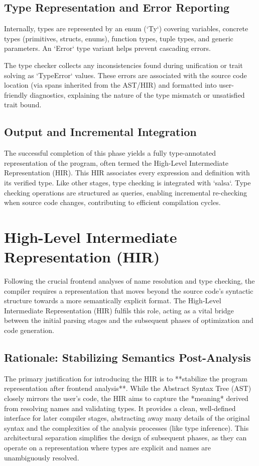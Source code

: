 \subsection{Type Representation and Error Reporting} %
Internally, types are represented by an enum (`Ty`) covering variables, concrete types (primitives, structs, enums), function types, tuple types, and generic parameters. An `Error` type variant helps prevent cascading errors.

The type checker collects any inconsistencies found during unification or trait solving as `TypeError` values. These errors are associated with the source code location (via spans inherited from the AST/HIR) and formatted into user-friendly diagnostics, explaining the nature of the type mismatch or unsatisfied trait bound.

\subsection{Output and Incremental Integration} %
The successful completion of this phase yields a fully type-annotated representation of the program, often termed the High-Level Intermediate Representation (HIR). This HIR associates every expression and definition with its verified type. Like other stages, type checking is integrated with `salsa`. Type checking operations are structured as queries, enabling incremental re-checking when source code changes, contributing to efficient compilation cycles.

\section{High-Level Intermediate Representation (HIR)} %
Following the crucial frontend analyses of name resolution and type checking, the compiler requires a representation that moves beyond the source code's syntactic structure towards a more semantically explicit format. The High-Level Intermediate Representation (HIR) fulfils this role, acting as a vital bridge between the initial parsing stages and the subsequent phases of optimization and code generation.

\subsection{Rationale: Stabilizing Semantics Post-Analysis} %
The primary justification for introducing the HIR is to **stabilize the program representation after frontend analysis**. While the Abstract Syntax Tree (AST) closely mirrors the user's code, the HIR aims to capture the *meaning* derived from resolving names and validating types. It provides a clean, well-defined interface for later compiler stages, abstracting away many details of the original syntax and the complexities of the analysis processes (like type inference). This architectural separation simplifies the design of subsequent phases, as they can operate on a representation where types are explicit and names are unambiguously resolved.

